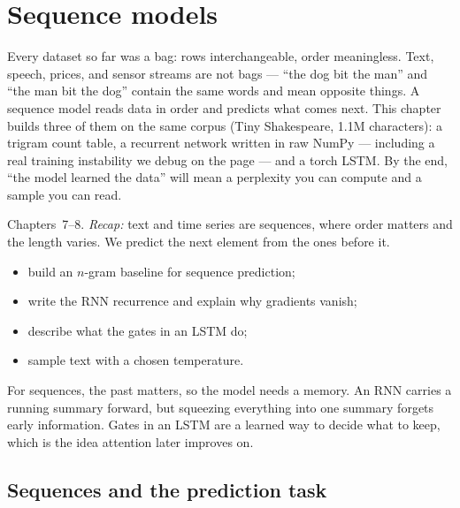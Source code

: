 \chapter{Sequence models}
\label{ch:seq}

Every dataset so far was a bag: rows interchangeable, order
meaningless. Text, speech, prices, and sensor streams are not bags ---
``the dog bit the man'' and ``the man bit the dog'' contain the same
words and mean opposite things. A sequence model reads data in order and predicts what comes next. This chapter
builds three of them on the same corpus (Tiny Shakespeare, 1.1M
characters): a trigram count table, a recurrent network written in raw
NumPy --- including a real training instability we debug on the page ---
and a torch LSTM. By the end, ``the model learned the data'' will mean
a perplexity you can compute and a sample you can read.

\begin{rulebox}
Chapters~7--8. \emph{Recap:} text and time series are sequences, where order matters and the length varies. We predict the next element from the ones before it.
\end{rulebox}
\begin{wins}
\begin{itemize}
\item build an $n$-gram baseline for sequence prediction;
\item write the RNN recurrence and explain why gradients vanish;
\item describe what the gates in an LSTM do;
\item sample text with a chosen temperature.
\end{itemize}
\end{wins}
\begin{principle}
For sequences, the past matters, so the model needs a memory. An RNN carries a running summary forward, but squeezing everything into one summary forgets early information. Gates in an LSTM are a learned way to decide what to keep, which is the idea attention later improves on.
\end{principle}

\section{Sequences and the prediction task}
\label{sec:seqtask}

